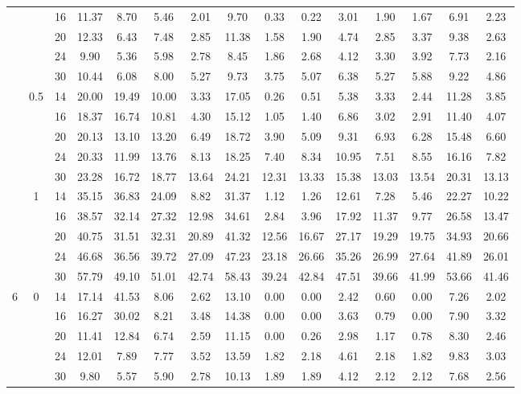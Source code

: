 \documentclass[num-refs]{wiley-article}
\begin{document}
\begin{table}[htbp!]
\begin{tabular}[t]{ccccccccccccccc}
& & 16 & 11.37 & 8.70 & 5.46 & 2.01 & 9.70 & 0.33 & 0.22 & 3.01 & 1.90 & 1.67 & 6.91 & 2.23\\
&& 20 & 12.33 & 6.43 & 7.48 & 2.85 & 11.38 & 1.58 & 1.90 & 4.74 & 2.85 & 3.37 & 9.38 & 2.63\\
& & 24 & 9.90 & 5.36 & 5.98 & 2.78 & 8.45 & 1.86 & 2.68 & 4.12 & 3.30 & 3.92 & 7.73 & 2.16\\
&& 30 & 10.44 & 6.08 & 8.00 & 5.27 & 9.73 & 3.75 & 5.07 & 6.38 & 5.27 & 5.88 & 9.22 & 4.86\\
\hline
 & 0.5 & 14 & 20.00 & 19.49 & 10.00 & 3.33 & 17.05 & 0.26 & 0.51 & 5.38 & 3.33 & 2.44 & 11.28 & 3.85\\
& & 16 & 18.37 & 16.74 & 10.81 & 4.30 & 15.12 & 1.05 & 1.40 & 6.86 & 3.02 & 2.91 & 11.40 & 4.07\\
& & 20 & 20.13 & 13.10 & 13.20 & 6.49 & 18.72 & 3.90 & 5.09 & 9.31 & 6.93 & 6.28 & 15.48 & 6.60\\
& & 24 & 20.33 & 11.99 & 13.76 & 8.13 & 18.25 & 7.40 & 8.34 & 10.95 & 7.51 & 8.55 & 16.16 & 7.82\\
&& 30 & 23.28 & 16.72 & 18.77 & 13.64 & 24.21 & 12.31 & 13.33 & 15.38 & 13.03 & 13.54 & 20.31 & 13.13\\
\hline
 & 1 & 14 & 35.15 & 36.83 & 24.09 & 8.82 & 31.37 & 1.12 & 1.26 & 12.61 & 7.28 & 5.46 & 22.27 & 10.22\\
&& 16 & 38.57 & 32.14 & 27.32 & 12.98 & 34.61 & 2.84 & 3.96 & 17.92 & 11.37 & 9.77 & 26.58 & 13.47\\
& & 20 & 40.75 & 31.51 & 32.31 & 20.89 & 41.32 & 12.56 & 16.67 & 27.17 & 19.29 & 19.75 & 34.93 & 20.66\\
&& 24 & 46.68 & 36.56 & 39.72 & 27.09 & 47.23 & 23.18 & 26.66 & 35.26 & 26.99 & 27.64 & 41.89 & 26.01\\
& & 30 & 57.79 & 49.10 & 51.01 & 42.74 & 58.43 & 39.24 & 42.84 & 47.51 & 39.66 & 41.99 & 53.66 & 41.46\\
\hline
6 & 0 & 14 & 17.14 & 41.53 & 8.06 & 2.62 & 13.10 & 0.00 & 0.00 & 2.42 & 0.60 & 0.00 & 7.26 & 2.02\\
&& 16 & 16.27 & 30.02 & 8.21 & 3.48 & 14.38 & 0.00 & 0.00 & 3.63 & 0.79 & 0.00 & 7.90 & 3.32\\
&& 20 & 11.41 & 12.84 & 6.74 & 2.59 & 11.15 & 0.00 & 0.26 & 2.98 & 1.17 & 0.78 & 8.30 & 2.46\\
& & 24 & 12.01 & 7.89 & 7.77 & 3.52 & 13.59 & 1.82 & 2.18 & 4.61 & 2.18 & 1.82 & 9.83 & 3.03\\
& & 30 & 9.80 & 5.57 & 5.90 & 2.78 & 10.13 & 1.89 & 1.89 & 4.12 & 2.12 & 2.12 & 7.68 & 2.56\\

\end{tabular}
\end{table}
\end{document}
